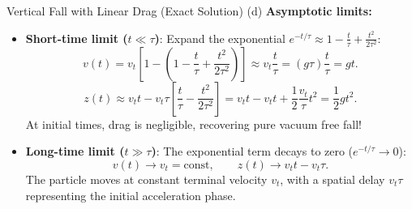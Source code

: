 \begin{workedexample}{Vertical Fall with Linear Drag (Exact Solution)}
(d) \textbf{Asymptotic limits:}
\begin{itemize}[leftmargin=1.4em,itemsep=2pt]
  \item \textbf{Short-time limit ($t \ll \tau$)}: Expand the exponential $e^{-t/\tau} \approx 1 - \frac{t}{\tau} + \frac{t^2}{2\tau^2}$:
  \[
  v(t) = v_t\left[ 1 - \left(1 - \frac{t}{\tau} + \frac{t^2}{2\tau^2}\right) \right] \approx v_t\frac{t}{\tau} = (g\tau)\frac{t}{\tau} = gt.
  \]
  \[
  z(t) \approx v_t t - v_t\tau\left[ \frac{t}{\tau} - \frac{t^2}{2\tau^2} \right] = v_t t - v_t t + \frac{1}{2}\frac{v_t}{\tau}t^2 = \frac{1}{2}gt^2.
  \]
  At initial times, drag is negligible, recovering pure vacuum free fall!
  \item \textbf{Long-time limit ($t \gg \tau$)}: The exponential term decays to zero ($e^{-t/\tau} \to 0$):
  \[
  v(t) \to v_t = \text{const}, \qquad z(t) \to v_t t - v_t\tau.
  \]
  The particle moves at constant terminal velocity $v_t$, with a spatial delay $v_t\tau$ representing the initial acceleration phase.
\end{itemize}
\end{workedexample}

